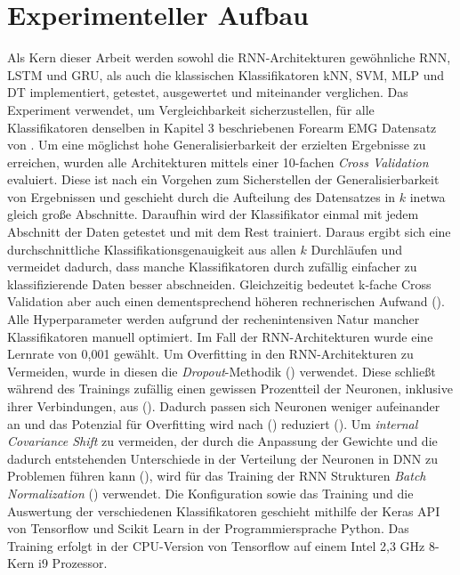 \chapter{Experimenteller Aufbau}
\label{chap:experiment}

Als Kern dieser Arbeit werden sowohl die RNN-Architekturen gewöhnliche RNN, LSTM und GRU, als auch die klassischen Klassifikatoren kNN, SVM, MLP und DT implementiert, getestet, ausgewertet und miteinander verglichen. Das Experiment verwendet, um Vergleichbarkeit sicherzustellen, für alle Klassifikatoren denselben in Kapitel 3 beschriebenen  Forearm EMG\grqq{} Datensatz von \cite{Kaufmann2013Data}. Um eine möglichst hohe Generalisierbarkeit der erzielten Ergebnisse zu erreichen, wurden alle Architekturen mittels einer 10-fachen \textit{Cross Validation} evaluiert. Diese ist nach \cite{kohavi1995study} ein Vorgehen zum Sicherstellen der Generalisierbarkeit von Ergebnissen und geschieht durch die Aufteilung des Datensatzes in $k$ inetwa gleich große Abschnitte. Daraufhin wird der Klassifikator einmal mit jedem Abschnitt der Daten getestet und mit dem Rest trainiert. Daraus ergibt sich eine durchschnittliche Klassifikationsgenauigkeit aus allen $k$ Durchläufen und vermeidet dadurch, dass manche Klassifikatoren durch zufällig \glqq einfacher\grqq{} zu klassifizierende Daten besser abschneiden. Gleichzeitig bedeutet k-fache Cross Validation aber auch einen dementsprechend höheren rechnerischen Aufwand (\cite{kohavi1995study}). Alle Hyperparameter werden aufgrund der rechenintensiven Natur mancher Klassifikatoren manuell optimiert. Im Fall der RNN-Architekturen wurde eine Lernrate von 0,001 gewählt. Um Overfitting in den RNN-Architekturen zu Vermeiden, wurde in diesen die \textit{Dropout}-Methodik (\cite{srivastava2014dropout}) verwendet. Diese schließt während des Trainings zufällig einen gewissen Prozentteil der Neuronen, inklusive ihrer Verbindungen, aus (\cite{srivastava2014dropout}). Dadurch passen sich Neuronen weniger aufeinander an und das Potenzial für Overfitting wird nach (\cite{srivastava2014dropout}) reduziert (\cite{srivastava2014dropout}). Um \textit{internal Covariance Shift} zu vermeiden, der durch die Anpassung der Gewichte und die dadurch entstehenden Unterschiede in der Verteilung der Neuronen in DNN zu Problemen führen kann (\cite{ioffe2015batch}), wird für das Training der RNN Strukturen \textit{Batch Normalization} (\cite{ioffe2015batch}) verwendet. Die Konfiguration sowie das Training und die Auswertung der verschiedenen Klassifikatoren geschieht mithilfe der Keras API von Tensorflow und Scikit Learn in der Programmiersprache Python. Das Training erfolgt in der CPU-Version von Tensorflow auf einem Intel 2,3 GHz 8-Kern i9 Prozessor.

